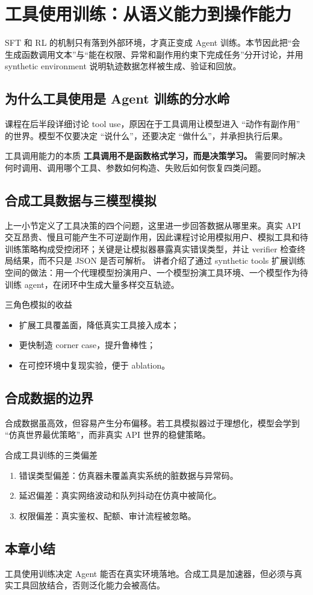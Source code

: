 \section{工具使用训练：从语义能力到操作能力}

SFT 和 RL 的机制只有落到外部环境，才真正变成 Agent 训练。本节因此把“会生成函数调用文本”与“能在权限、异常和副作用约束下完成任务”分开讨论，并用 synthetic environment 说明轨迹数据怎样被生成、验证和回放。

\subsection{为什么工具使用是 Agent 训练的分水岭}
课程在后半段详细讨论 tool use，原因在于工具调用让模型进入 ``动作有副作用'' 的世界。模型不仅要决定 ``说什么''，还要决定 ``做什么''，并承担执行后果。

\begin{importantbox}{工具调用能力的本质}
\textbf{工具调用不是函数格式学习，而是决策学习。} 需要同时解决何时调用、调用哪个工具、参数如何构造、失败后如何恢复四类问题。
\end{importantbox}

\subsection{合成工具数据与三模型模拟}
上一小节定义了工具决策的四个问题，这里进一步回答数据从哪里来。真实 API 交互昂贵、慢且可能产生不可逆副作用，因此课程讨论用模拟用户、模拟工具和待训练策略构成受控闭环；关键是让模拟器暴露真实错误类型，并让 verifier 检查终局结果，而不只是 JSON 是否可解析。
讲者介绍了通过 synthetic tools 扩展训练空间的做法：用一个代理模型扮演用户、一个模型扮演工具环境、一个模型作为待训练 agent，在闭环中生成大量多样交互轨迹。

\begin{knowledgebox}{三角色模拟的收益}
\begin{itemize}
    \item 扩展工具覆盖面，降低真实工具接入成本；
    \item 更快制造 corner case，提升鲁棒性；
    \item 在可控环境中复现实验，便于 ablation。
\end{itemize}
\end{knowledgebox}

\subsection{合成数据的边界}
合成数据虽高效，但容易产生分布偏移。若工具模拟器过于理想化，模型会学到 ``仿真世界最优策略''，而非真实 API 世界的稳健策略。

\begin{warningbox}{合成工具训练的三类偏差}
\begin{enumerate}
    \item 错误类型偏差：仿真器未覆盖真实系统的脏数据与异常码。
    \item 延迟偏差：真实网络波动和队列抖动在仿真中被简化。
    \item 权限偏差：真实鉴权、配额、审计流程被忽略。
\end{enumerate}
\end{warningbox}

\subsection{本章小结}
工具使用训练决定 Agent 能否在真实环境落地。合成工具是加速器，但必须与真实工具回放结合，否则泛化能力会被高估。


